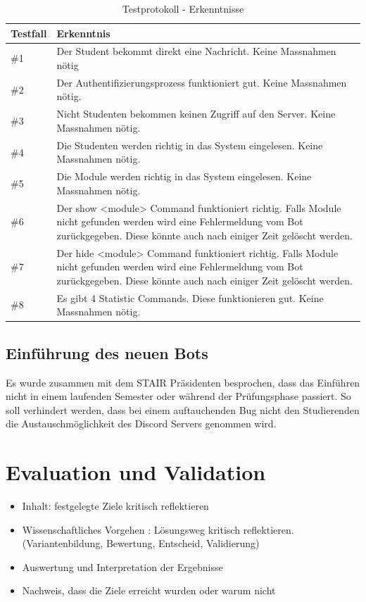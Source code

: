 \documentclass[a4paper, table]{article}
\begin{document}
\begin{table}[h]
    \centering
    \begin{tabular}{|l|p{30em}|}
        \hline
        \rowcolor[gray]{.9} Testfall & Erkenntnis \\
        \hline
        \#1 & Der Student bekommt direkt eine Nachricht. Keine Massnahmen nötig \\
        \hline
        \#2 & Der Authentifizierungsprozess funktioniert gut. Keine Massnahmen nötig. \\
        \hline
        \#3 & Nicht Studenten bekommen keinen Zugriff auf den Server. Keine Massnahmen nötig. \\
        \hline
        \#4 & Die Studenten werden richtig in das System eingelesen. Keine Massnahmen nötig. \\
        \hline
        \#5 & Die Module werden richtig in das System eingelesen. Keine Massnahmen nötig. \\
        \hline
        \#6 & 
            Der show <module> Command funktioniert richtig.
            Falls Module nicht gefunden werden wird eine Fehlermeldung vom Bot zurückgegeben.
            Diese könnte auch nach einiger Zeit gelöscht werden. \\
        \hline
        \#7 & 
            Der hide <module> Command funktioniert richtig.
            Falls Module nicht gefunden werden wird eine Fehlermeldung vom Bot zurückgegeben.
            Diese könnte auch nach einiger Zeit gelöscht werden. \\
        \hline
        \#8 & Es gibt 4 Statistic Commands. Diese funktionieren gut. Keine Massnahmen nötig. \\
        \hline
    \end{tabular}
    \caption{Testprotokoll - Erkenntnisse}
    \label{tab: test-protocol-knowledge}
\end{table}

\subsection{Einführung des neuen Bots}
Es wurde zusammen mit dem STAIR Präsidenten besprochen, dass das Einführen nicht in einem laufenden Semester oder während der Prüfungsphase passiert.
So soll verhindert werden, dass bei einem auftauchenden Bug nicht den Studierenden die Austauschmöglichkeit des Discord Servers genommen wird.

\newpage
\section{Evaluation und Validation}
\begin{itemize}
    \item Inhalt: festgelegte Ziele kritisch reflektieren
    \item Wissenschaftliches Vorgehen : Lösungsweg kritisch reflektieren. (Variantenbildung, Bewertung, Entscheid, Validierung)
    \item Auswertung und Interpretation der Ergebnisse
    \item Nachweis, dass die Ziele erreicht wurden oder warum nicht
\end{itemize}
\end{document}
